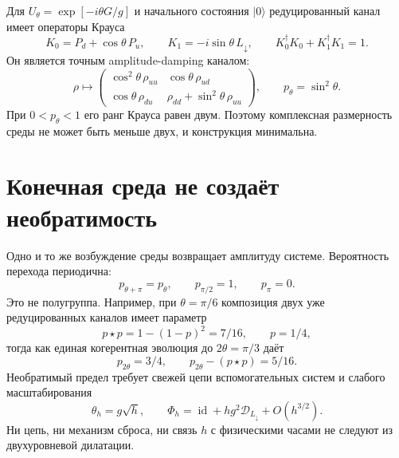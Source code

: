 Для $U_\theta=\exp[-i\theta G/g]$ и начального состояния $|0\rangle$
редуцированный канал имеет операторы Крауса
\begin{equation}
 K_0=P_d+\cos\theta\,P_u,\qquad
 K_1=-i\sin\theta\,L_\downarrow,\qquad
 K_0^\dagger K_0+K_1^\dagger K_1=1.
 \label{eq:v8-charged-mediator-kraus}
\end{equation}
Он является точным amplitude-damping каналом:
\begin{equation}
 \rho\longmapsto
 \begin{pmatrix}
 \cos^2\theta\,\rho_{uu}&\cos\theta\,\rho_{ud}\\
 \cos\theta\,\rho_{du}&\rho_{dd}+\sin^2\theta\,\rho_{uu}
 \end{pmatrix},
 \qquad p_\theta=\sin^2\theta.
 \label{eq:v8-charged-mediator-channel}
\end{equation}
При $0<p_\theta<1$ его ранг Крауса равен двум. Поэтому комплексная
размерность среды не может быть меньше двух, и конструкция минимальна.

\section{Конечная среда не создаёт необратимость}

Одно и то же возбуждение среды возвращает амплитуду системе. Вероятность
перехода периодична:
\begin{equation}
 p_{\theta+\pi}=p_\theta,\qquad
 p_{\pi/2}=1,\qquad p_\pi=0.
 \label{eq:v8-charged-mediator-revival}
\end{equation}
Это не полугруппа. Например, при $\theta=\pi/6$ композиция двух уже
редуцированных каналов имеет параметр
\begin{equation}
 p\star p=1-(1-p)^2=7/16,\qquad p=1/4,
 \label{eq:v8-charged-mediator-channel-composition}
\end{equation}
тогда как единая когерентная эволюция до $2\theta=\pi/3$ даёт
\begin{equation}
 p_{2\theta}=3/4,\qquad p_{2\theta}-(p\star p)=5/16.
 \label{eq:v8-charged-mediator-semigroup-defect}
\end{equation}
Необратимый предел требует свежей цепи вспомогательных систем и слабого
масштабирования
\begin{equation}
 \theta_h=g\sqrt h,\qquad
 \Phi_h=\operatorname{id}+h g^2\mathcal D_{L_\downarrow}+O(h^{3/2}).
 \label{eq:v8-charged-mediator-weak-collision}
\end{equation}
Ни цепь, ни механизм сброса, ни связь $h$ с физическими часами не следуют
из двухуровневой дилатации.

